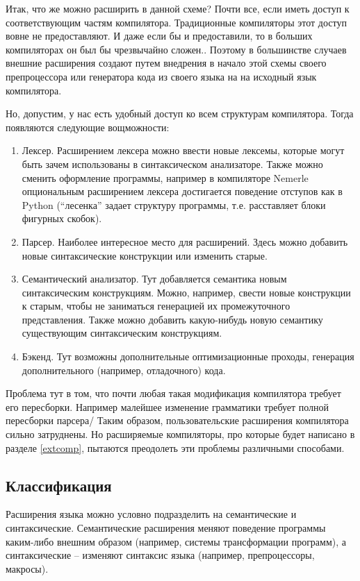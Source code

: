 \documentclass[a4paper,12pt]{article}
\begin{document}
Итак, что же можно расширить в данной схеме? Почти все, если иметь доступ к
соответствующим частям компилятора. Традиционные компиляторы этот доступ вовне
не предоставляют. И даже если бы и предоставили, то в больших компиляторах он
был бы чрезвычайно сложен.. Поэтому в большинстве случаев внешние расширения
создают путем внедрения в начало этой схемы своего препроцессора или генератора
кода из своего языка на на исходный язык компилятора.

Но, допустим, у нас есть удобный доступ ко всем структурам компилятора. Тогда
появляются следующие вощможности:

\begin{enumerate}
  \item Лексер. Расширением лексера можно ввести новые лексемы, которые могут
  быть зачем использованы в синтаксическом анализаторе. Также можно сменить
  оформление программы, например в компиляторе Nemerle опциональным расширением
  лексера достигается поведение отступов как в Python (``лесенка'' задает
  структуру программы, т.е. расставляет блоки фигурных скобок).
  \item Парсер. Наиболее интересное место для расширений. Здесь можно добавить
  новые синтаксические конструкции или изменить старые.
  \item Семантический анализатор. Тут добавляется семантика новым
  синтаксическим конструкциям. Можно, например, свести новые конструкции к
  старым, чтобы не заниматься генерацией их промежуточного представления.
  Также можно добавить какую-нибудь новую семантику существующим
  синтаксическим конструкциям.
  \item Бэкенд. Тут возможны дополнительные оптимизационные проходы, генерация
  дополнительного (например, отладочного) кода.
\end{enumerate}
Проблема тут в том, что почти любая такая модификация компилятора требует его
пересборки. Например малейшее изменение грамматики требует полной пересборки
парсера/ Таким образом, пользовательские расширения компилятора сильно
затруднены. Но расширяемые компиляторы, про которые будет написано в разделе
\ref{extcomp}, пытаются преодолеть эти проблемы различными способами.

\subsection{Классификация}

Расширения языка можно условно подразделить на семантические и синтаксические.
Семантические расширения меняют поведение программы каким-либо внешним образом
(например, системы трансформации программ), а синтаксические -- изменяют
синтаксис языка (например, препроцессоры, макросы).
\end{document}
